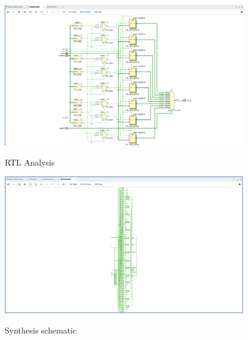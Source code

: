 \documentclass{article} %
\begin{document}
\includegraphics[width=0.8\textwidth]{2.png}\par
RTL Analysis\par
\par

$$
$$
\includegraphics[width=0.8\textwidth]{3.png}\par
Synthesis schematic\par
\end{document}
